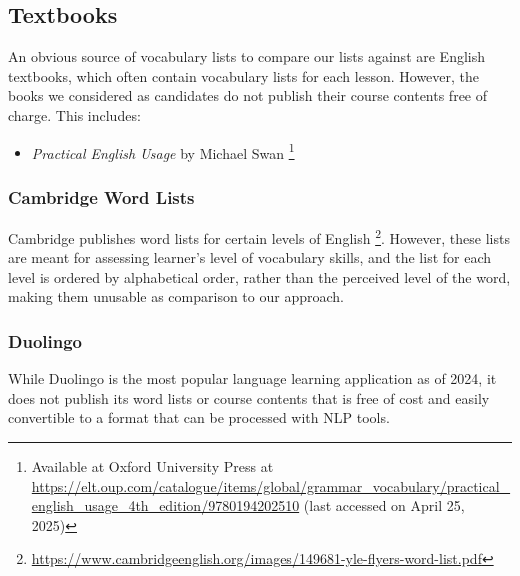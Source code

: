 \subsection{Textbooks}
An obvious source of vocabulary lists to compare our lists against are English textbooks, which often contain vocabulary lists for each lesson.
However, the books we considered as candidates do not publish their course contents free of charge.
This includes:
\begin{itemize}
	\item \textit{Practical English Usage} by Michael Swan \footnote{Available at Oxford University Press at \url{https://elt.oup.com/catalogue/items/global/grammar_vocabulary/practical_english_usage_4th_edition/9780194202510} (last accessed on April 25, 2025)}
\end{itemize}

\subsubsection{Cambridge Word Lists}
Cambridge publishes word lists for certain levels of English \footnote{\url{https://www.cambridgeenglish.org/images/149681-yle-flyers-word-list.pdf}}.
However, these lists are meant for assessing learner's level of vocabulary skills, and the list for each level is ordered by alphabetical order, rather than the perceived level of the word, making them unusable as comparison to our approach.

\subsubsection{Duolingo}
While Duolingo is the most popular language learning application as of 2024, it does not publish its word lists or course contents that is free of cost and easily convertible to a format that can be processed with NLP tools.

